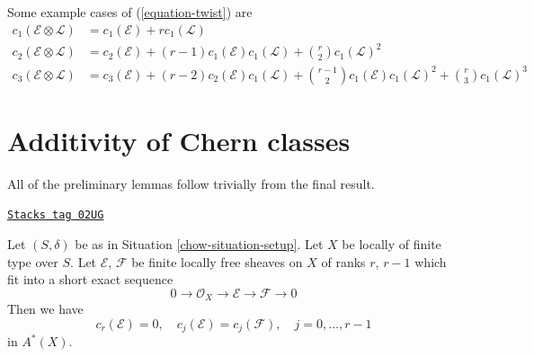 Some example cases of (\ref{equation-twist}) are
\begin{align*}
c_1(\mathcal{E} \otimes \mathcal{L})
& =
c_1(\mathcal{E}) +
r c_1(\mathcal{L}) \\
c_2(\mathcal{E} \otimes \mathcal{L})
& =
c_2(\mathcal{E}) +
(r - 1) c_1(\mathcal{E}) c_1(\mathcal{L}) +
\binom{r}{2} c_1(\mathcal{L})^2 \\
c_3(\mathcal{E} \otimes \mathcal{L})
& =
c_3(\mathcal{E}) +
(r - 2) c_2(\mathcal{E})c_1(\mathcal{L}) +
\binom{r - 1}{2} c_1(\mathcal{E})c_1(\mathcal{L})^2 +
\binom{r}{3} c_1(\mathcal{L})^3
\end{align*}

\section{Additivity of Chern classes}
\label{chow-section-additivity-chern-classes}
All of the preliminary lemmas follow trivially from the
final result.

\begin{lemma}
\label{chow-lemma-get-rid-of-trivial-subbundle}
\href{https://stacks.math.columbia.edu/tag/02UG}{\texttt{Stacks tag 02UG}}

Let $(S, \delta)$ be as in Situation \ref{chow-situation-setup}.
Let $X$ be locally of finite type over $S$.
Let $\mathcal{E}$, $\mathcal{F}$ be finite locally free sheaves
on $X$ of ranks $r$, $r - 1$ which fit into a short
exact sequence
$$
0 \to \mathcal{O}_X \to \mathcal{E} \to \mathcal{F} \to 0
$$
Then we have
$$
c_r(\mathcal{E}) = 0, \quad
c_j(\mathcal{E}) = c_j(\mathcal{F}), \quad j = 0, \ldots, r - 1
$$
in $A^*(X)$.
\end{lemma}

